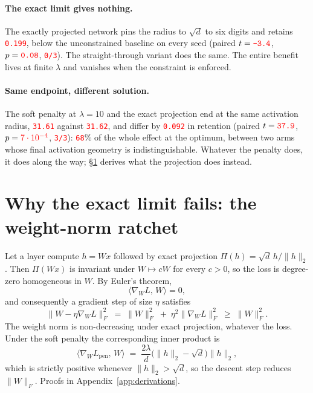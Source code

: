 \documentclass[anon]{opt2026}     %
\newcommand{\PH}[1]{\textcolor{red}{\texttt{#1}}}   %
\newcommand{\PHm}[1]{{\color{red}#1}}                  %
\begin{document}
\paragraph{The exact limit gives nothing.} The exactly projected network pins
the radius to $\sqrt d$ to six digits and retains \PH{0.199}, below the
unconstrained baseline on every seed (paired $t = \PH{-3.4}$, $p = \PH{0.08}$,
\PH{0/3}). The straight-through variant does the same. The entire benefit lives
at finite $\lambda$ and vanishes when the constraint is enforced.

\paragraph{Same endpoint, different solution.} The soft penalty at
$\lambda = 10$ and the exact projection end at the same activation radius,
\PH{31.61} against \PH{31.62}, and differ by \PH{0.092} in retention (paired
$t = \PH{37.9}$, $p = \PHm{7\cdot10^{-4}}$, \PH{3/3}): \PH{68}\% of the whole
effect at the optimum, between two arms whose final activation geometry is
indistinguishable. Whatever the penalty does, it does along the way;
\S\ref{sec:ratchet} derives what the projection does instead.

\section{Why the exact limit fails: the weight-norm ratchet}
\label{sec:ratchet}

\begin{proposition}
\label{prop:ratchet}
Let a layer compute $h = Wx$ followed by exact projection
$\Pi(h) = \sqrt{d}\,h/\|h\|_2$. Then $\Pi(Wx)$ is invariant under
$W \mapsto cW$ for every $c > 0$, so the loss is degree-zero homogeneous in
$W$. By Euler's theorem,
\begin{equation}
\label{eq:orthogonal}
\bigl\langle \nabla_W L, \, W \bigr\rangle = 0 ,
\end{equation}
and consequently a gradient step of size $\eta$ satisfies
\begin{equation}
\label{eq:ratchet}
\bigl\| W - \eta \nabla_W L \bigr\|_F^{2}
  \;=\; \|W\|_F^{2} \;+\; \eta^{2}\bigl\|\nabla_W L\bigr\|_F^{2}
  \;\ge\; \|W\|_F^{2}.
\end{equation}
The weight norm is non-decreasing under exact projection, whatever the loss.
Under the soft penalty the corresponding inner product is
\begin{equation}
\label{eq:restoring}
\bigl\langle \nabla_W L_{\mathrm{pen}},\, W \bigr\rangle
  \;=\; \frac{2\lambda}{d}\bigl(\|h\|_2 - \sqrt d\bigr)\|h\|_2 ,
\end{equation}
which is strictly positive whenever $\|h\|_2 > \sqrt d$, so the descent step
reduces $\|W\|_F$. Proofs in Appendix~\ref{app:derivations}.
\end{proposition}
\end{document}
